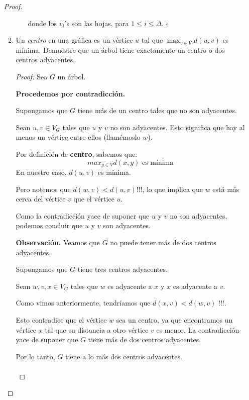 \documentclass{article}
\begin{document}
\begin{enumerate}
\begin{proof}
\begin{enumerate}
\begin{enumerate}
        donde los $v_i$'s son las hojas, para $1 \leq i \leq \Delta$.
        \hfill $\square$
        \end{enumerate}

    \item Un {\em centro} en una gr\'afica es un v\'ertice
      $u$ tal que $\max_{v \in V} d(u, v)$ es m\'inima.
      Demuestre que un \'arbol tiene exactamente un centro
      o dos centros adyacentes.

      \renewcommand\qedsymbol{QED}
      \begin{proof}
        Sea $G$ un árbol.

        \textbf{Procedemos por contradicción.}

        Supongamos que $G$ tiene más de un centro tales que no son adyacentes.

        Sean $u, v \in V_{G}$ tales que $u$ y $v$ no son adyacentes.
        Esto significa que hay al menos un vértice entre ellos (llamémoslo $w$).

        Por definición de \textbf{centro}, sabemos que:
        $$max_{y \in V}d(x,y) \text{ es mínima}$$
        En nuestro caso, $d(u, v)$ es mínima.

        Pero notemos que $d(w, v) < d(u, v)$!!!, lo que implica que $w$ est\'a m\'as
        cerca del v\'ertice $v$ que el v\'ertice $u$.

        Como la contradicción yace de suponer que $u$ y $v$ no son adyacentes, podemos
        concluir que $u$ y $v$ son adyacentes.

        \textbf{Observación.} Veamos que $G$ no puede tener más de dos centros adyacentes.

        Supongamos que $G$ tiene tres centros adyacentes.

        Sean $w, v, x \in V_{G}$ tales que $w$ es adyacente a $x$ y $x$ es adyacente a $v$.

        Como vimos anteriormente, tendríamos que $d(x, v) < d(w, v)$ !!!.

        Esto contradice que el vértice $w$ sea un centro, ya que encontramos un vértice
        $x$ tal que su distancia a otro vértice $v$ es menor.
        La contradicción yace de suponer que $G$ tiene más de dos centros adyacentes.

        Por lo tanto, $G$ tiene a lo más dos centros adyacentes. \\
        \\
      \end{proof}


\end{enumerate}
\end{proof}
\end{enumerate}
\end{document}
